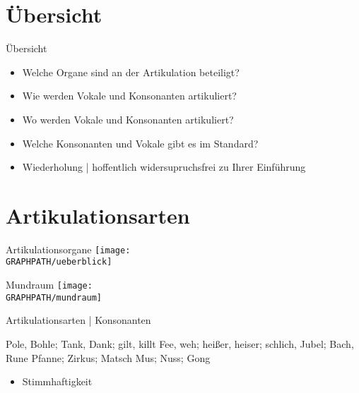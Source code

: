 \section{Übersicht}

\begin{frame}
  {Übersicht}
  \pause
  \begin{itemize}[<+->]
    \item Welche \alert{Organe} sind an der Artikulation beteiligt?
    \item \alert{Wie} werden Vokale und Konsonanten artikuliert?
    \item \alert{Wo} werden Vokale und Konsonanten artikuliert?
    \item Welche Konsonanten und Vokale gibt es im \alert{Standard}?
      \Zeile
    \item Wiederholung | hoffentlich widersupruchsfrei zu Ihrer Einführung 
  \end{itemize}
\end{frame}

\section{Artikulationsarten}

\begin{frame}
  {Artikulationsorgane}
  \pause
  \centering
  \texttt{[image: \\GRAPHPATH/ueberblick]}
\end{frame}

\begin{frame}
  {Mundraum}
  \pause
  \centering
  \texttt{[image: \\GRAPHPATH/mundraum]}
\end{frame}

\begin{frame}
  {Artikulationsarten | Konsonanten}
  \pause
    \begin{exe}
      \ex \alert{P}ole, \alert{B}ohle; \alert{T}ank, \alert{D}ank; \alert{g}ilt, \alert{k}illt
      \pause
      \ex \alert{F}ee, \alert{w}eh; hei\alert{ß}er, hei\alert{s}er; schli\alert{ch}, \alert{J}ubel; Ba\alert{ch}, \alert{R}une
      \pause
      \ex \alert{Pf}anne; \alert{Z}irkus; Ma\alert{tsch}
      \pause
      \ex \alert{M}us; \alert{N}uss; Go\alert{ng}
    \end{exe}
    \pause
    \Large
    \begin{itemize}
      \item[\ding{220}] \alert{Stimmhaftigkeit}
    \end{itemize}
\end{frame}


